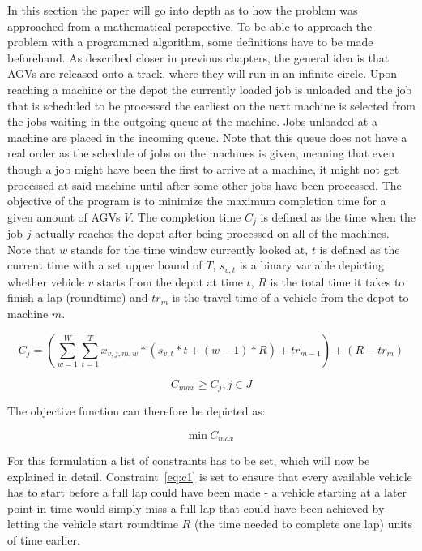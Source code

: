 \setcounter{equation}{0}
In this section the paper will go into depth as to how the problem was approached from a mathematical perspective. To be able to approach the problem
with a programmed algorithm, some definitions have to be made beforehand. As described closer in previous chapters, the general idea is that AGVs
are released onto a track, where they will run in an infinite circle. Upon reaching a machine or the depot the currently loaded job is unloaded and
the job that is scheduled to be processed the earliest on the next machine is selected from the jobs waiting in the outgoing queue at the machine.
Jobs unloaded at a machine are placed in the incoming queue. Note that this queue does not have a real order as the schedule of jobs on the machines is
given, meaning that even though a job might have been the first to arrive at a machine, it might not get processed at said machine until after some
other jobs have been processed. The objective of the program is to minimize the maximum completion time for a given amount of AGVs \(V\). The completion time
\(C_{j}\) is defined as the time when the job \(j\) actually reaches the depot after being processed on all of the machines. Note that \(w\) stands for the time window currently looked at, \(t\) is defined as the current time with a set upper bound of \(T\), \(s_{v,t}\) is a binary variable depicting whether vehicle \(v\) starts from the depot at time \(t\), \(R\) is the total time it takes to finish a lap (roundtime) and \(tr_{m}\) is the travel time of a vehicle from the depot to machine \(m\).

\[
  C_{j} = (\sum_{w=1}^{W}\sum_{t=1}^{T} x_{v,j,m,w} * (s_{v,t} * t + (w-1) * R) + tr_{m-1}) + (R-tr_{m})
\]

\[  
  C_{max} \geq C_{j}, j \in J
\]

The objective function can therefore be depicted as:

\begin{equation} \label{eq:c1}
\mathrm{min}\>C_{max}
\end{equation}

For this formulation a list of constraints has to be set, which will now be explained in detail. Constraint~\ref{eq:c1} is set to ensure
that every available vehicle has to start before a full lap could have been made - a vehicle starting at a later point in time would
simply miss a full lap that could have been achieved by letting the vehicle start roundtime \(R\) (the time needed to complete one lap) units of time earlier.

